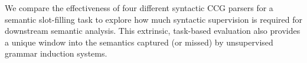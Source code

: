 We compare the effectiveness of four different syntactic CCG parsers for a semantic slot-filling task to explore how much syntactic supervision is required for downstream semantic analysis.  This extrinsic, task-based evaluation also provides a unique window into the semantics captured (or missed) by unsupervised grammar induction systems.
